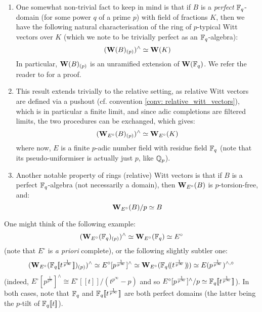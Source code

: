             \begin{remark} \label{remark: witt_vectors_over_perfect_rings}
                \noindent
                \begin{enumerate}
                    \item One somewhat non-trivial fact to keep in mind is that if $B$ is a \textit{perfect} $\mathbb{F}_q$-domain (for some power $q$ of a prime $p$) with field of fractions $K$, then we have the following natural characterisation of the ring of $p$-typical Witt vectors over $K$ (which we note to be trivially perfect as an $\mathbb{F}_q$-algebra):
                    $$(\mathbf{W}(B)_{(p)})^{\wedge} \simeq \mathbf{W}(K)$$
                    In particular, $\mathbf{W}(B)_{(p)}$ is an unramified extension of $\mathbf{W}(\mathbb{F}_q)$. We refer the reader to \cite[Proposition 5.2]{shimomoto2014witt} for a proof.
                    \item This result extends trivially to the relative setting, as relative Witt vectors are defined via a pushout (cf. convention \ref{conv: relative_witt_vectors}), which is in particular a finite limit, and since adic completions are filtered limits, the two procedures can be exchanged, which gives:
                        $$(\mathbf{W}_{E^{\circ}}(B)_{(p)})^{\wedge} \simeq \mathbf{W}_{E^{\circ}}(K)$$
                    where now, $E$ is a finite $p$-adic number field with residue field $\mathbb{F}_q$ (note that its pseudo-uniformiser is actually just $p$, like $\mathbb{Q}_p$).
                    \item Another notable property of rings (relative) Witt vectors is that if $B$ is a perfect $\mathbb{F}_q$-algebra (not necessarily a domain), then $\mathbf{W}_{E^{\circ}}(B)$ is $p$-torsion-free, and:
                        $$\mathbf{W}_{E^{\circ}}(B)/p \simeq B$$
                \end{enumerate}
            \end{remark}
            \begin{example}
                One might think of the following example:
                    $$(\mathbf{W}_{E^{\circ}}(\mathbb{F}_q)_{(p)})^{\wedge} \simeq \mathbf{W}_{E^{\circ}}(\mathbb{F}_q) \simeq E^{\circ}$$
                (note that $E^{\circ}$ is \textit{a priori} complete), or the following slightly subtler one:
                    $$( \mathbf{W}_{E^{\circ}}( \mathbb{F}_q[\![t^{\frac{1}{p^{\infty}}}]\!] )_{(p)} )^{\wedge} \simeq E^{\circ}[p^{\frac{1}{p^{\infty}}}]^{\wedge} \simeq \mathbf{W}_{E^{\circ}}( \mathbb{F}_q(\!(t^{\frac{1}{p^{\infty}}})\!) ) \simeq E(p^{\frac{1}{p^{\infty}}})^{\wedge, \circ}$$
                (indeed, $E^{\circ}[p^{\frac{1}{p^{\infty}}}]^{\wedge} \cong E^{\circ}[\![t]\!]/(t^{p^{\infty}} - p)$ and so $E^{\circ}[p^{\frac{1}{p^{\infty}}}]^{\wedge}/p \simeq \mathbb{F}_q[\![t^{\frac{1}{p^{\infty}}}]\!]$). In both cases, note that $\mathbb{F}_q$ and $\mathbb{F}_q[\![t^{\frac{1}{p^{\infty}}}]\!]$ are both perfect domains (the latter being the $p$-tilt of $\mathbb{F}_q[\![t]\!]$).
            \end{example}
        
